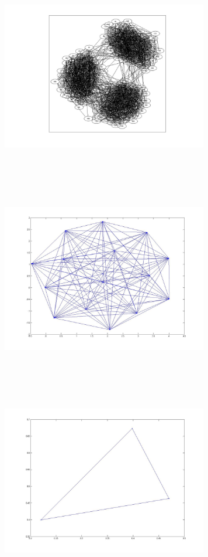 \includegraphics[width=9.0cm,height=9.0cm]{images/GraphTheory/3Inhomog_Cluster_PreScaleFree.jpg}
\includegraphics[width=9.0cm,height=9.0cm]{images/GraphTheory/Clique_12_Members.jpg}
\includegraphics[width=9.0cm,height=9.0cm]{images/GraphTheory/Clique_3_Members.jpg}
